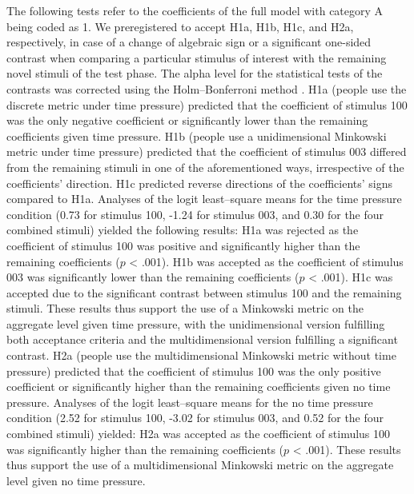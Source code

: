 \documentclass[a4paper,man,natbib]{apa6}
\begin{document}
The following tests refer to the coefficients of the full model with category A being coded as 1. We preregistered to accept H1a, H1b, H1c, and H2a, respectively, in case of a change of algebraic sign or a significant one-sided contrast when comparing a particular stimulus of interest with the remaining novel stimuli of the test phase. The alpha level for the statistical tests of the contrasts was corrected using the Holm--Bonferroni method \citep{holm1979simple}. H1a (people use the discrete metric under time pressure) predicted that the coefficient of stimulus 100 was the only negative coefficient or significantly lower than the remaining coefficients given time pressure. H1b (people use a unidimensional Minkowski metric under time pressure) predicted that the coefficient of stimulus 003 differed from the remaining stimuli in one of the aforementioned ways, irrespective of the coefficients' direction. H1c predicted reverse directions of the coefficients' signs compared to H1a. Analyses of the logit least--square means for the time pressure condition (0.73 for stimulus 100, -1.24 for stimulus 003, and 0.30 for the four combined stimuli) yielded the following results: H1a was rejected as the coefficient of stimulus 100 was positive and significantly higher than the remaining coefficients ($p$ < .001). H1b was accepted as the coefficient of stimulus 003 was significantly lower than the remaining coefficients ($p$ < .001). H1c was accepted due to the significant contrast between stimulus 100 and the remaining stimuli. These results thus support the use of a Minkowski metric on the aggregate level given time pressure, with the unidimensional version fulfilling both acceptance criteria and the multidimensional version fulfilling a significant contrast. H2a (people use the multidimensional Minkowski metric without time pressure) predicted that the coefficient of stimulus 100 was the only positive coefficient or significantly higher than the remaining coefficients given no time pressure. Analyses of the logit least--square means for the no time pressure condition (2.52 for stimulus 100, -3.02 for stimulus 003, and 0.52 for the four combined stimuli) yielded: H2a was accepted as the coefficient of stimulus 100 was significantly higher than the remaining coefficients ($p$ < .001). These results thus support the use of a multidimensional Minkowski metric on the aggregate level given no time pressure.
\end{document}

